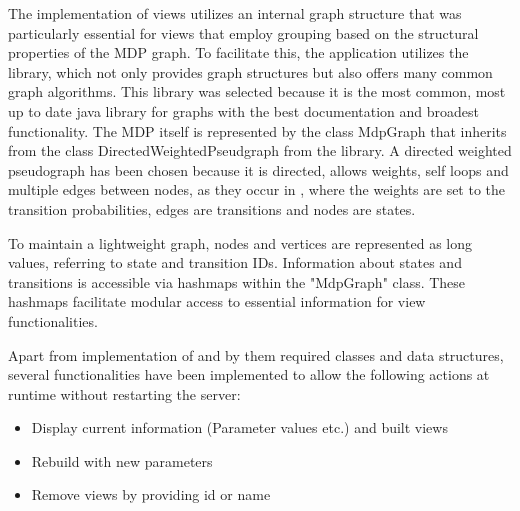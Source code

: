 \documentclass[preview]{standalone}
\begin{document}
The implementation of views utilizes an internal graph structure that was particularly essential for views that employ grouping based on the structural properties of the MDP graph. To facilitate this, the application utilizes the \jgrapht library, which not only provides graph structures but also offers many common graph algorithms. This library was selected because it is the most common, most up to date java library for graphs with the best documentation and broadest functionality. The MDP itself is represented by the class MdpGraph that inherits from the class DirectedWeightedPseudgraph from the \jgrapht library. A directed weighted pseudograph has been chosen because it is directed, allows weights, self loops and multiple edges between nodes, as they occur in \chgphsN, where the weights are set to the transition probabilities, edges are transitions and nodes are states.

To maintain a lightweight graph, nodes and vertices are represented as long values, referring to state and transition IDs. Information about states and transitions is accessible via hashmaps within the "MdpGraph" class. These hashmaps facilitate modular access to essential information for view functionalities.

Apart from implementation of \viewsN and by them required classes and data structures, several functionalities have been implemented to allow the following actions at runtime without restarting the server: 
\begin{itemize}
	\item Display current \viewN information (Parameter values etc.) and built views
	\item Rebuild \viewN with new parameters
	\item Remove views by providing id or name		
\end{itemize}
\end{document}
